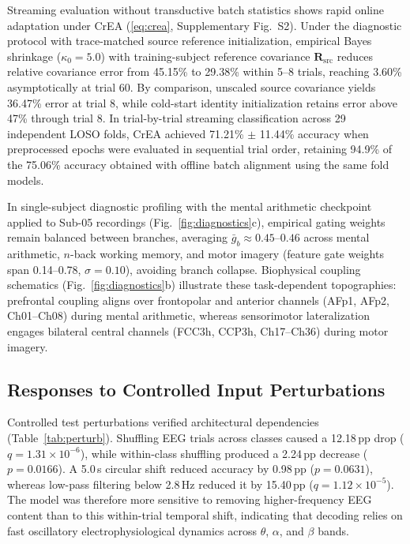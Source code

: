 \documentclass[journal]{IEEEtran}
\begin{document}
Streaming evaluation without transductive batch statistics shows rapid online adaptation under CrEA (\eqref{eq:crea}, Supplementary Fig.~S2). Under the diagnostic protocol with trace-matched source reference initialization, empirical Bayes shrinkage ($\kappa_0 = 5.0$) with training-subject reference covariance $\mathbf{R}_{\mathrm{src}}$ reduces relative covariance error from 45.15\% to 29.38\% within 5--8 trials, reaching 3.60\% asymptotically at trial 60. By comparison, unscaled source covariance yields 36.47\% error at trial 8, while cold-start identity initialization retains error above 47\% through trial 8. In trial-by-trial streaming classification across 29 independent LOSO folds, CrEA achieved 71.21\% $\pm$ 11.44\% accuracy when preprocessed epochs were evaluated in sequential trial order, retaining 94.9\% of the 75.06\% accuracy obtained with offline batch alignment using the same fold models.

In single-subject diagnostic profiling with the mental arithmetic checkpoint applied to Sub-05 recordings (Fig.~\ref{fig:diagnostics}c), empirical gating weights remain balanced between branches, averaging $\bar{g}_b \approx 0.45\text{--}0.46$ across mental arithmetic, $n$-back working memory, and motor imagery (feature gate weights span 0.14--0.78, $\sigma = 0.10$), avoiding branch collapse. Biophysical coupling schematics (Fig.~\ref{fig:diagnostics}b) illustrate these task-dependent topographies: prefrontal coupling aligns over frontopolar and anterior channels (AFp1, AFp2, Ch01--Ch08) during mental arithmetic, whereas sensorimotor lateralization engages bilateral central channels (FCC3h, CCP3h, Ch17--Ch36) during motor imagery.

\subsection{Responses to Controlled Input Perturbations}
Controlled test perturbations verified architectural dependencies (Table~\ref{tab:perturb}). Shuffling EEG trials across classes caused a 12.18\,pp drop ($q = 1.31\times 10^{-6}$), while within-class shuffling produced a 2.24\,pp decrease ($p = 0.0166$). A 5.0\,s circular shift reduced accuracy by 0.98\,pp ($p = 0.0631$), whereas low-pass filtering below 2.8\,Hz reduced it by 15.40\,pp ($q = 1.12\times 10^{-5}$). The model was therefore more sensitive to removing higher-frequency EEG content than to this within-trial temporal shift, indicating that decoding relies on fast oscillatory electrophysiological dynamics across $\theta$, $\alpha$, and $\beta$ bands.
\end{document}
